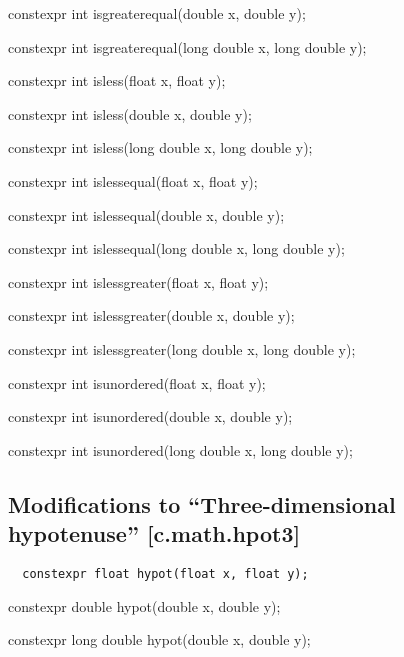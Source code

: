 \documentclass[prd,twocolumn,amsmath,amssymb,nofootinbib,eqsecnum]{revtex4-1}
\newcommand{\code}[1]{{\tt #1}}
\newcommand{\highlight}[1]{{\color{green} #1}}
\newcommand{\oldhighlight}[1]{{\color{blue} #1}}
\begin{document}
{\oldhighlight{constexpr} int isgreaterequal(double x, double y);

\oldhighlight{constexpr} int isgreaterequal(long double x, long double y);

\vspace{2ex}


\oldhighlight{constexpr} int isless(float x, float y);

\oldhighlight{constexpr} int isless(double x, double y);

\oldhighlight{constexpr} int isless(long double x, long double y);

\vspace{2ex}


\oldhighlight{constexpr} int islessequal(float x, float y);

\oldhighlight{constexpr} int islessequal(double x, double y);

\oldhighlight{constexpr} int islessequal(long double x, long double y);

\vspace{2ex}


\oldhighlight{constexpr} int islessgreater(float x, float y);

\oldhighlight{constexpr} int islessgreater(double x, double y);

\oldhighlight{constexpr} int islessgreater(long double x, long double y);

\vspace{2ex}


\oldhighlight{constexpr} int isunordered(float x, float y);

\oldhighlight{constexpr} int isunordered(double x, double y);

\oldhighlight{constexpr} int isunordered(long double x, long double y);

}


\subsection{Modifications to ``Three-dimensional hypotenuse''  [c.math.hpot3]}

\code{
	\highlight{constexpr} float hypot(float x, float y); 

	\highlight{constexpr} double hypot(double x, double y);

	\highlight{constexpr} long double hypot(double x, double y); 
}
\end{document}

